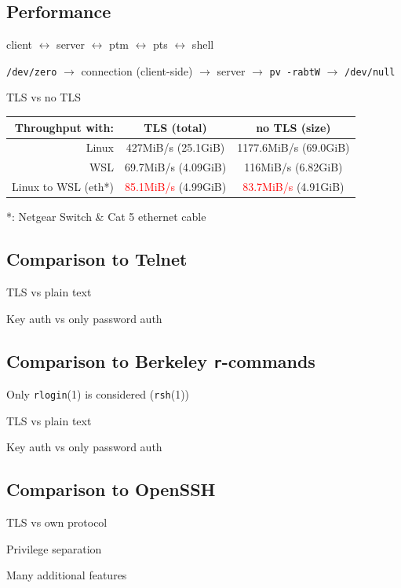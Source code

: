 \documentclass[
	xcolor=dvipsnames,
	handout
]{beamer}
\newenvironment{zhawframe}[1][]
{\begin{frame}[environment=fr,#1]{\insertsubsectionhead}{\insertsectionhead}}
{\end{frame}
}
\begin{document}
\subsection{Performance}
\begin{zhawframe}
 client \textcolor{green!60!blue}{$\leftrightarrow$} server $\leftrightarrow$ ptm $\leftrightarrow$ pts $\leftrightarrow$ shell

 \texttt{/dev/zero} $\rightarrow$ connection (client-side) $\rightarrow$ server $\rightarrow$ \texttt{pv -rabtW} $\rightarrow$ \texttt{/dev/null}

 TLS vs no TLS

\begin{table}[ht]
\centering
\begin{tabular}{rcc}
Throughput with:		& TLS (total)	& no TLS (size)\\\hline
Linux 					& 427MiB/s (25.1GiB)	& 1177.6MiB/s (69.0GiB)\\
WSL 					& 69.7MiB/s (4.09GiB)	& 116MiB/s (6.82GiB)\\
Linux to WSL (eth*) 	& \textcolor{red}{85.1MiB/s} (4.99GiB)	& \textcolor{red}{83.7MiB/s} (4.91GiB)
\end{tabular}
\end{table}
 *: Netgear Switch \& Cat 5 ethernet cable
\end{zhawframe}

\subsection{Comparison to Telnet}
\begin{zhawframe}
 TLS vs plain text

 Key auth vs only password auth
\end{zhawframe}

\subsection{Comparison to Berkeley \texttt{r}-commands}
\begin{zhawframe}
 Only \texttt{rlogin}(1) is considered (\texttt{rsh}(1))

 TLS vs plain text

 Key auth vs only password auth
\end{zhawframe}

\subsection{Comparison to OpenSSH}
\begin{zhawframe}
 TLS vs own protocol

 Privilege separation

 Many additional features
\end{zhawframe}
\end{document}
